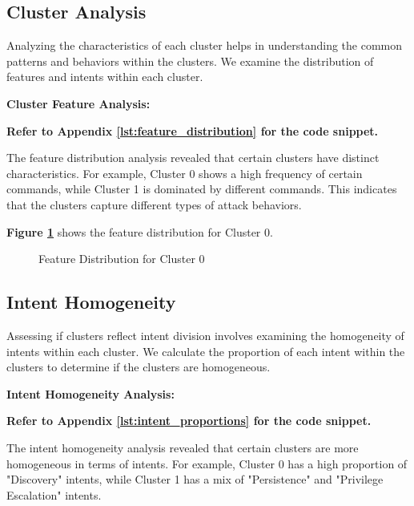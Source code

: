     \subsection{Cluster Analysis}
    
        Analyzing the characteristics of each cluster helps in understanding the common patterns and behaviors within the clusters. We examine the distribution of features and intents within each cluster.

        \textbf{Cluster Feature Analysis:}
        
        \vspace{0.5em}

        \textbf{Refer to Appendix \ref{lst:feature_distribution} for the code snippet.}

        The feature distribution analysis revealed that certain clusters have distinct characteristics. For example, Cluster 0 shows a high frequency of certain commands, while Cluster 1 is dominated by different commands. This indicates that the clusters capture different types of attack behaviors.

        \textbf{Figure \ref{fig:cluster-feature-distribution}} shows the feature distribution for Cluster 0.

        \begin{figure}[h]
            \centering
            \caption{Feature Distribution for Cluster 0}
            \label{fig:cluster-feature-distribution}
        \end{figure}

    \subsection{Intent Homogeneity}
    
        Assessing if clusters reflect intent division involves examining the homogeneity of intents within each cluster. We calculate the proportion of each intent within the clusters to determine if the clusters are homogeneous.

        \textbf{Intent Homogeneity Analysis:}
        
        \vspace{0.5em}

        \textbf{Refer to Appendix \ref{lst:intent_proportions} for the code snippet.}

        The intent homogeneity analysis revealed that certain clusters are more homogeneous in terms of intents. For example, Cluster 0 has a high proportion of "Discovery" intents, while Cluster 1 has a mix of "Persistence" and "Privilege Escalation" intents.

